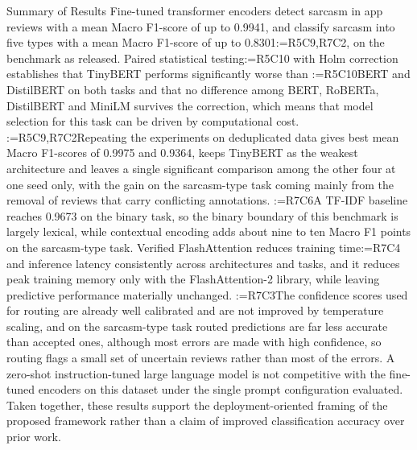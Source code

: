\documentclass[a4paper,fleqn]{cas-sc}
\makeatletter
\newif\iftracked
\newcommand{\rv@setcolour}[1]{%
  \IfStrEq{#1}{R7C7}{\color{rvEdit}}{%
    \IfSubStr{#1}{R5}{\IfSubStr{#1}{R7}{\color{rvBoth}}{\color{rvFive}}}{\color{rvSeven}}}}
\newcommand{\rv@tag}[1]{\textsuperscript{\sffamily\bfseries\scriptsize[\StrSubstitute{#1}{,}{, }]}\,}
\newcommand{\rv@recordone}[1]{%
  \edef\rv@i{#1}%
  \ifcsdef{rv@n@\rv@i}{}{\csgdef{rv@n@\rv@i}{0}}%
  \csxdef{rv@n@\rv@i}{\the\numexpr\csuse{rv@n@\rv@i}+1\relax}%
  \begingroup\edef\@currentlabel{\rv@i}\label{rv:\rv@i:\csuse{rv@n@\rv@i}}\endgroup}
\newcommand{\rv@record}[1]{\@for\rv@id:=#1\do{\expandafter\rv@recordone\expandafter{\rv@id}}}
\DeclareRobustCommand{\rc}[2]{\rv@record{#1}\iftracked{\rv@setcolour{#1}\rv@tag{#1}#2}\else#2\fi}
\DeclareRobustCommand{\rcrep}[3]{\rv@record{#1}\iftracked{\rv@setcolour{#1}\rv@tag{#1}\rv@strike{#2} #3}\else#3\fi}
\makeatother
\begin{document}
\begin{keyfinding}{Summary of Results}\label{box:summary}
Fine-tuned transformer encoders detect sarcasm in app reviews with a mean Macro F1-score of up to 0.9941, and classify sarcasm into five types with a mean Macro F1-score of up to 0.8301\rc{R5C9,R7C2}{, on the benchmark as released}. Paired statistical testing\rc{R5C10}{ with Holm correction} establishes that TinyBERT performs significantly worse than \rcrep{R5C10}{the other four architectures on both tasks and that the remaining four architectures are not reliably distinguishable from one another}{BERT and DistilBERT on both tasks and that no difference among BERT, RoBERTa, DistilBERT and MiniLM survives the correction}, which means that model selection for this task can be driven by computational cost. \rc{R5C9,R7C2}{Repeating the experiments on deduplicated data gives best mean Macro F1-scores of 0.9975 and 0.9364, keeps TinyBERT as the weakest architecture and leaves a single significant comparison among the other four at one seed only, with the gain on the sarcasm-type task coming mainly from the removal of reviews that carry conflicting annotations.} \rc{R7C6}{A TF-IDF baseline reaches 0.9673 on the binary task, so the binary boundary of this benchmark is largely lexical, while contextual encoding adds about nine to ten Macro F1 points on the sarcasm-type task.} Verified FlashAttention reduces training time\rcrep{R7C4}{, inference latency, and peak GPU memory consistently across architectures and tasks}{ and inference latency consistently across architectures and tasks, and it reduces peak training memory only with the FlashAttention-2 library,} while leaving predictive performance materially unchanged. \rc{R7C3}{The confidence scores used for routing are already well calibrated and are not improved by temperature scaling, and on the sarcasm-type task routed predictions are far less accurate than accepted ones, although most errors are made with high confidence, so routing flags a small set of uncertain reviews rather than most of the errors.} A zero-shot instruction-tuned large language model is not competitive with the fine-tuned encoders on this dataset under the single prompt configuration evaluated. Taken together, these results support the deployment-oriented framing of the proposed framework rather than a claim of improved classification accuracy over prior work.
\end{keyfinding}

\end{document}
